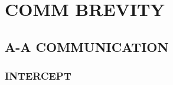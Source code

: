 \chapter{COMM BREVITY}
\localtableofcontents
\thispagestyle{plain}
\cleardoublepage

\section{A-A COMMUNICATION}

\subsection{INTERCEPT}